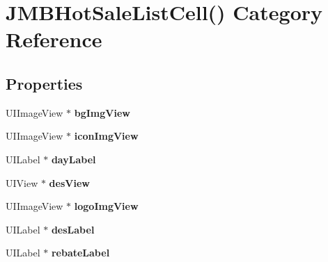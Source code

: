 \hypertarget{category_j_m_b_hot_sale_list_cell_07_08}{}\section{J\+M\+B\+Hot\+Sale\+List\+Cell() Category Reference}
\label{category_j_m_b_hot_sale_list_cell_07_08}
\subsection*{Properties}
\begin{DoxyCompactItemize}
\item 
\mbox{\label{category_j_m_b_hot_sale_list_cell_07_08_a61536b51d164c9e68baa079c2338bfa5}} 
U\+I\+Image\+View $\ast$ {\bfseries bg\+Img\+View}
\item 
\mbox{\label{category_j_m_b_hot_sale_list_cell_07_08_a54561d6bf2d7236678f94744e6a3b14d}} 
U\+I\+Image\+View $\ast$ {\bfseries icon\+Img\+View}
\item 
\mbox{\label{category_j_m_b_hot_sale_list_cell_07_08_a7faea9e05f9a88e92463b9eb169e19e9}} 
U\+I\+Label $\ast$ {\bfseries day\+Label}
\item 
\mbox{\label{category_j_m_b_hot_sale_list_cell_07_08_a8cd1884da451e2789538d1f3eaf31f07}} 
U\+I\+View $\ast$ {\bfseries des\+View}
\item 
\mbox{\label{category_j_m_b_hot_sale_list_cell_07_08_a7fa4900d277a7d50529b5b2049acdc97}} 
U\+I\+Image\+View $\ast$ {\bfseries logo\+Img\+View}
\item 
\mbox{\label{category_j_m_b_hot_sale_list_cell_07_08_a73b5aa533c65fbd70f24b8b2466616b8}} 
U\+I\+Label $\ast$ {\bfseries des\+Label}
\item 
\mbox{\label{category_j_m_b_hot_sale_list_cell_07_08_a641a33fa7aeed5763919917e98cc49c4}} 
U\+I\+Label $\ast$ {\bfseries rebate\+Label}
\item 
\mbox{\label{category_j_m_b_hot_sale_list_cell_07_08_acb5fbb1cc220d42b4d0e636a14ba3c3d}} 

\end{DoxyCompactItemize}
